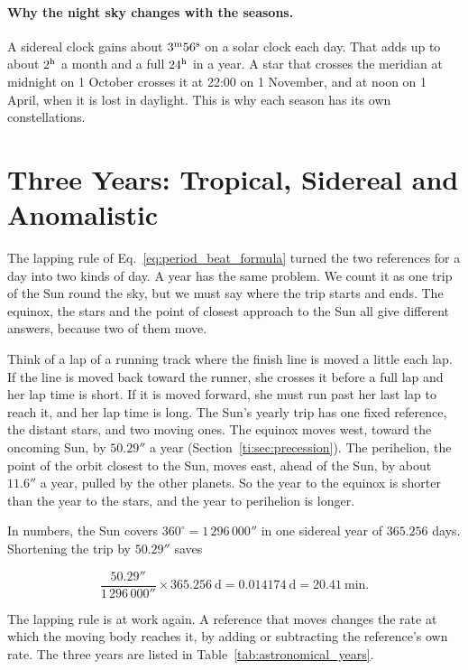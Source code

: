 \paragraph{Why the night sky changes with the seasons.} A sidereal clock gains about $3^{\rm m}56^{\rm s}$ on a solar clock each day. That adds up to about $2^{\rm h}$ a month and a full $24^{\rm h}$ in a year. A star that crosses the meridian at midnight on 1 October crosses it at 22:00 on 1 November, and at noon on 1 April, when it is lost in daylight. This is why each season has its own constellations.

\section{Three Years: Tropical, Sidereal and Anomalistic}
\label{ti:sec:years}

The lapping rule of Eq.~\eqref{eq:period_beat_formula} turned the two references for a day into two kinds of day. A year has the same problem. We count it as one trip of the Sun round the sky, but we must say where the trip starts and ends. The equinox, the stars and the point of closest approach to the Sun all give different answers, because two of them move.

Think of a lap of a running track where the finish line is moved a little each lap. If the line is moved back toward the runner, she crosses it before a full lap and her lap time is short. If it is moved forward, she must run past her last lap to reach it, and her lap time is long. The Sun's yearly trip has one fixed reference, the distant stars, and two moving ones. The equinox moves west, toward the oncoming Sun, by $50.29''$ a year (Section~\ref{ti:sec:precession}). The perihelion, the point of the orbit closest to the Sun, moves east, ahead of the Sun, by about $11.6''$ a year, pulled by the other planets. So the year to the equinox is shorter than the year to the stars, and the year to perihelion is longer.

In numbers, the Sun covers $360^\circ=1\,296\,000''$ in one sidereal year of $365.256$ days. Shortening the trip by $50.29''$ saves

\[
\frac{50.29''}{1\,296\,000''}\times365.256\ \text{d} = 0.014174\ \text{d} = 20.41\ \text{min}.
\]

The lapping rule is at work again. A reference that moves changes the rate at which the moving body reaches it, by adding or subtracting the reference's own rate. The three years are listed in Table~\ref{tab:astronomical_years}.

